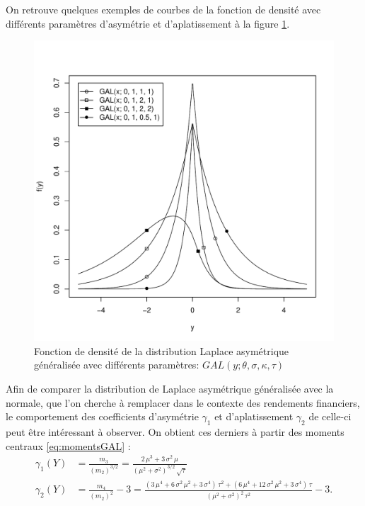 On retrouve quelques exemples de courbes de la fonction de densité
avec différents paramètres d'asymétrie et d'aplatissement à la figure
\ref{fig:densiteGAL}.
\begin{figure}[!ht]
  \centering
  \includegraphics[scale=0.8]{./graphiques/dGAL-exemples.pdf}
  \caption{Fonction de densité de la distribution Laplace asymétrique
    généralisée avec différents paramètres:
    $GAL(y;\theta,\sigma,\kappa,\tau)$}
  \label{fig:densiteGAL}
\end{figure}

Afin de comparer la distribution de Laplace asymétrique généralisée
avec la normale, que l'on cherche à remplacer dans le contexte des
rendements financiers, le comportement des coefficients d'asymétrie
$\gamma_1$ et d'aplatissement $\gamma_2$ de celle-ci peut être
intéressant à observer. On obtient ces derniers à partir des moments
centraux \eqref{eq:momentsGAL} :
\begin{subequations}\label{eq:moments56GAL}
  \begin{align}
    \gamma_1(Y) &= \frac{m_3}{(m_2)^{3/2}} =
    \frac{2\,{\mu}^{3}+3\,{\sigma}^{2}\,\mu}{{\left( {\mu}^{2}+{\sigma}^{2}\right) }^{3/2}\,\sqrt{\tau}}\label{eq:moments5GAL}\\
    \gamma_2(Y) &= \frac{m_4}{(m_2)^{2}} - 3 = \frac{\left(
        3\,{\mu}^{4}+6\,{\sigma}^{2}\,{\mu}^{2}+3\,{\sigma}^{4}\right)
      \,{\tau}^{2}+\left(
        6\,{\mu}^{4}+12\,{\sigma}^{2}\,{\mu}^{2}+3\,{\sigma}^{4}\right)
      \,\tau}{{\left( {\mu}^{2}+{\sigma}^{2}\right) }^{2}\,{\tau}^{2}}
    - 3.\label{eq:moments6GAL}
  \end{align}
\end{subequations}

